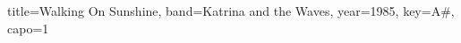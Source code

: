 \documentclass{skrul-leadsheet}
\begin{document}
\begin{song}[transpose-capo=true]{title={Walking On Sunshine}, band={Katrina and the Waves}, year={1985}, key={A#}, capo={1}}



\end{song}
\end{document}
